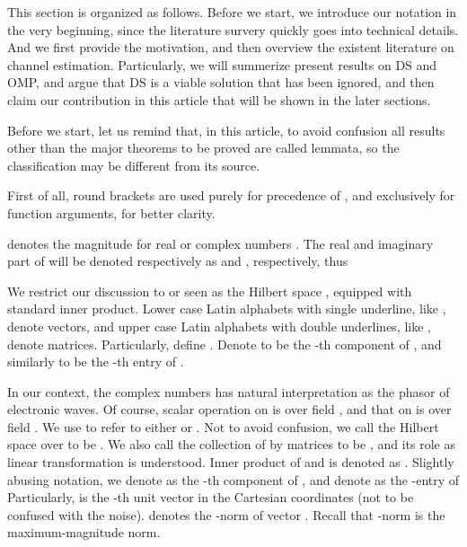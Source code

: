 \startchapter [title={Introduction}]


This section is organized as follows.
Before we start, we introduce our notation in the very beginning, since the literature survery quickly goes into technical details.
And we first provide the motivation, and then overview the existent literature on channel estimation.
Particularly, we will summerize present results on DS and OMP, and argue that DS is a viable solution that has been ignored, and then claim our contribution in this article that will be shown in the later sections.

\startsection [title={Notation}]

Before we start, let us remind that, in this article, to avoid confusion all results other than the major theorems to be proved are called lemmata, so the classification may be different from its source.

First of all, round brackets \m {\RB {\cdot}} are used purely for precedence of , and \m {\SB {\cdot}} exclusively for function arguments, for better clarity.

 denotes the magnitude for real or complex numbers .
The real and imaginary part of  will be denoted respectively as  and , respectively, thus 

We restrict our discussion to  or  seen as the Hilbert space , equipped with standard inner product.
Lower case Latin alphabets with single underline, like , denote vectors, and upper case Latin alphabets with double underlines, like , denote matrices.
Particularly, define .
Denote  to be the -th component of , and similarly  to be the -th entry of .

In our context, the complex numbers has natural interpretation as the phasor of electronic waves.
Of course, scalar operation on  is over field , and that on  is over field .
We use  to refer to either  or .
Not to avoid confusion, we call the Hilbert space  over  to be .
We also call the collection of  by  matrices to be , and its role as linear transformation is understood.
Inner product of  and  is denoted as .
Slightly abusing notation, we denote as  the -th component of , and denote as  the -entry of 
Particularly,  is the -th unit vector in the Cartesian coordinates (not to be confused with the noise).
 denotes the -norm of vector .
Recall that \m {\ell_\infty}-norm is the maximum-magnitude norm.

